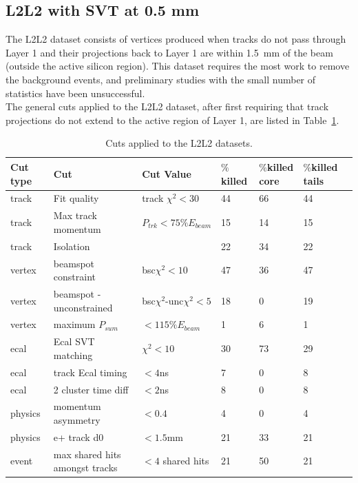 \subsection{L2L2 with SVT at 0.5 mm}

The L2L2 dataset consists of vertices produced when tracks do not pass through Layer 1 and their projections back to Layer 1 are within 1.5~mm of the beam (outside the active silicon region). This dataset requires the most work to remove the background events, and preliminary studies with the small number of statistics have been unsuccessful. \\
\indent The general cuts applied to the L2L2 dataset, after first requiring that track projections do not extend to the active region of Layer 1, are listed in Table~\ref{l2l2_cuts}.

\begin{table}[H]
\caption{Cuts applied to the L2L2 datasets.}
\label{l2l2_cuts}
\centering
\begin{tabular}{lllllll}
\toprule
Cut type & Cut & Cut Value &  $\%$killed &  $\%$killed core & $\%$killed tails\\
\midrule
track & Fit quality & track $\chi^{2}<30$ & 44 & 66 & 44 \\
track & Max track momentum &  $P_{trk}<75\%E_{beam}$ & 15 & 14 & 15 \\
track & Isolation &   & 22 & 34 & 22 \\
vertex & beamspot constraint & bsc$\chi^{2}<10$  & 47 & 36 & 47 \\
vertex & beamspot - unconstrained & bsc$\chi^{2}$-unc$\chi^2<5$  & 18 & 0 & 19 \\
vertex & maximum $P_{sum}$ &  $<115\%E_{beam}$ & 1 & 6 & 1 \\
ecal & Ecal SVT matching & $\chi^2<10$  & 30 & 73 & 29 \\
ecal & track Ecal timing & $<4$ns  & 7 & 0 & 8 \\
ecal & 2 cluster time diff & $<2$ns  & 8 & 0 & 8 \\
physics & momentum asymmetry & $<0.4$  & 4 & 0 & 4 \\
physics & e+ track d0 & $<1.5$mm  & 21 & 33 & 21 \\
event & max shared hits amongst tracks & $<4$ shared hits  & 21 & 50 & 21 \\
\bottomrule
\end{tabular}
\end{table}

